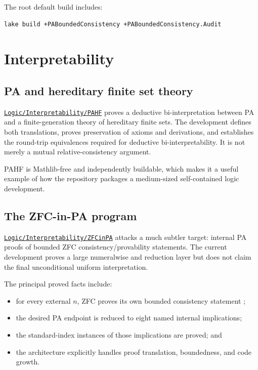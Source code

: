 \documentclass[
  10pt,
  a4paper,
  twoside,
  open=any,
  parskip=half,
  headings=big
]{scrreprt}
\newcommand{\CommitFull}{56a402bf82a9aab119fcbe3e96b991d387b221c5}
\newcommand{\RepoWeb}{https://github.com/VladimirReshetnikov/ProveIt}
\newcommand{\RepoTreeBase}{\RepoWeb/tree/\CommitFull}
\newcommand{\code}[1]{\texttt{\detokenize{#1}}}
\newcommand{\RepoDir}[1]{\href{\RepoTreeBase/#1}{\nolinkurl{#1}}}
\begin{document}
The root default build includes:

\begin{lstlisting}[language=bash]
lake build +PABoundedConsistency +PABoundedConsistency.Audit
\end{lstlisting}

\section{Interpretability}
\label{sec:interpretability}

\subsection{PA and hereditary finite set theory}

\RepoDir{Logic/Interpretability/PAHF} proves a deductive bi-interpretation between PA and a finite-generation theory of hereditary finite sets. The development defines both translations, proves preservation of axioms and derivations, and establishes the round-trip equivalences required for deductive bi-interpretability. It is not merely a mutual relative-consistency argument.

PAHF is Mathlib-free and independently buildable, which makes it a useful example of how the repository packages a medium-sized self-contained logic development.

\subsection{The ZFC-in-PA program}

\RepoDir{Logic/Interpretability/ZFCinPA} attacks a much subtler target: internal PA proofs of bounded ZFC consistency/provability statements. The current development proves a large numeralwise and reduction layer but does not claim the final unconditional uniform interpretation.

The principal proved facts include:

\begin{itemize}
  \item for every external $n$, ZFC proves its own bounded consistency statement \code{Con_n(ZFC)};
  \item the desired PA endpoint is reduced to eight named internal implications;
  \item the standard-index instances of those implications are proved; and
  \item the architecture explicitly handles proof translation, boundedness, and code growth.
\end{itemize}
\end{document}
